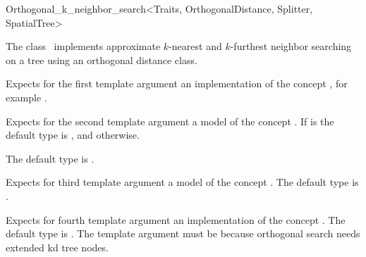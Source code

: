 

\begin{ccRefClass}{Orthogonal_k_neighbor_search<Traits, OrthogonalDistance, Splitter, SpatialTree>}


\ccDefinition

The class \ccRefName\ implements approximate $k$-nearest and
$k$-furthest neighbor searching  on a tree
using an orthogonal distance class.


\ccParameters

Expects for the first template argument an implementation of the concept ,
for example .

Expects for the second template argument a model of the
concept . If  is 
the default type is ,
and  otherwise.


The default type is 
.

Expects for third template argument a model of the concept .
The default type is .

Expects for fourth template argument an implementation of the concept .
The default type is .  The 
template argument must be  because orthogonal search needs extended 
kd tree nodes.

\ccTypes



\end{ccRefClass}
